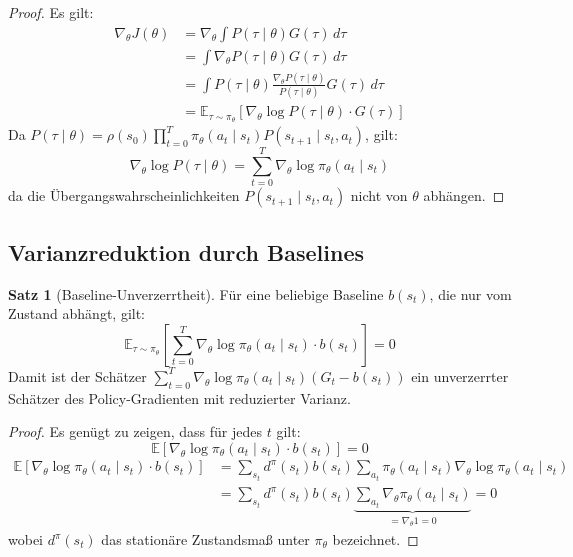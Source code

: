 ﻿\documentclass[a4paper,12pt]{article}
\theoremstyle{definition}
\newtheorem{satz}{Satz}
\begin{document}
\begin{proof}
  Es gilt:
  \begin{align*}
    \nabla_\theta J(\theta)
    &= \nabla_\theta \int P(\tau \mid \theta) G(\tau) \, d\tau \\
    &= \int \nabla_\theta P(\tau \mid \theta) G(\tau) \, d\tau \\
    &= \int P(\tau \mid \theta) \frac{\nabla_\theta P(\tau \mid \theta)}{P(\tau \mid \theta)} G(\tau) \, d\tau \\
    &= \mathbb{E}_{\tau \sim \pi_\theta}\!\left[\nabla_\theta \log P(\tau \mid \theta) \cdot G(\tau)\right]
  \end{align*}
  Da $P(\tau \mid \theta) = \rho(s_0) \prod_{t=0}^{T} \pi_\theta(a_t \mid s_t) P(s_{t+1} \mid s_t, a_t)$,
  gilt:
  \[
    \nabla_\theta \log P(\tau \mid \theta) = \sum_{t=0}^{T} \nabla_\theta \log \pi_\theta(a_t \mid s_t)
  \]
  da die \"Ubergangswahrscheinlichkeiten $P(s_{t+1} \mid s_t, a_t)$ nicht von $\theta$ abh\"angen.
\end{proof}

\subsection{Varianzreduktion durch Baselines}

\begin{satz}[Baseline-Unverzerrtheit]
  F\"ur eine beliebige Baseline $b(s_t)$, die nur vom Zustand abh\"angt, gilt:
  \[
    \mathbb{E}_{\tau \sim \pi_\theta}\!\left[
      \sum_{t=0}^{T} \nabla_\theta \log \pi_\theta(a_t \mid s_t) \cdot b(s_t)
    \right] = 0
  \]
  Damit ist der Sch\"atzer $\sum_{t=0}^{T} \nabla_\theta \log \pi_\theta(a_t \mid s_t)(G_t - b(s_t))$
  ein unverzerrter Sch\"atzer des Policy-Gradienten mit reduzierter Varianz.
\end{satz}

\begin{proof}
  Es gen\"ugt zu zeigen, dass f\"ur jedes $t$ gilt:
  \[
    \mathbb{E}\!\left[\nabla_\theta \log \pi_\theta(a_t \mid s_t) \cdot b(s_t)\right] = 0
  \]
  \begin{align*}
    \mathbb{E}\!\left[\nabla_\theta \log \pi_\theta(a_t \mid s_t) \cdot b(s_t)\right]
    &= \sum_{s_t} d^\pi(s_t) b(s_t) \sum_{a_t} \pi_\theta(a_t \mid s_t)
       \nabla_\theta \log \pi_\theta(a_t \mid s_t) \\
    &= \sum_{s_t} d^\pi(s_t) b(s_t)
       \underbrace{\sum_{a_t} \nabla_\theta \pi_\theta(a_t \mid s_t)}_{= \nabla_\theta 1 = 0}
    = 0
  \end{align*}
  wobei $d^\pi(s_t)$ das station\"are Zustandsma\ss{} unter $\pi_\theta$ bezeichnet.
\end{proof}
\end{document}

